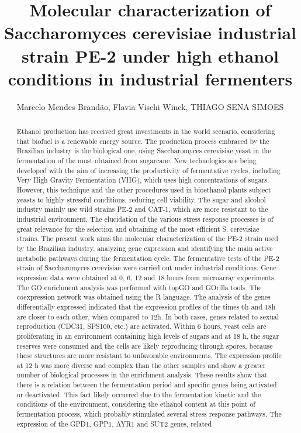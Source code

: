 \documentclass[twoside]{article}
\title{\vspace{-15mm}\fontsize{24pt}{10pt}\selectfont\textbf{ Molecular characterization of Saccharomyces cerevisiae industrial strain PE-2 under high ethanol conditions in industrial fermenters }} %
\author{ Marcelo Mendes Brand\~ao,  Flavia Vischi Winck,  THIAGO SENA SIMOES }
\affil{ CBMEG/UNICAMP }
\date{}
\begin{document}
  
  
  \maketitle %
  
  
  \thispagestyle{fancy} %
  
  
  \begin{abstract}
  Ethanol production has received great investments in the world scenario,  considering that biofuel is a renewable energy source. The production process embraced by the Brazilian industry is the biological one,  using Saccharomyces cerevisiae yeast in the fermentation of the must obtained from sugarcane. New technologies are being developed with the aim of increasing the productivity of fermentative cycles,  including Very High Gravity Fermentation (VHG),  which uses high concentrations of sugars. However,  this technique and the other procedures used in bioethanol plants subject yeasts to highly stressful conditions,  reducing cell viability. The sugar and alcohol industry mainly use wild strains PE-2 and CAT-1,  which are more resistant to the industrial environment. The elucidation of the various stress response processes is of great relevance for the selection and obtaining of the most efficient S. cerevisiae strains. The present work aims the molecular characterization of the PE-2 strain used by the Brazilian industry,  analyzing gene expression and identifying the main active metabolic pathways during the fermentation cycle. The fermentative tests of the PE-2 strain of Saccharomyces cerevisiae were carried out under industrial conditions. Gene expression data were obtained at 0,  6,  12 and 18 hours from microarray experiments. The GO enrichment analysis was performed with topGO and GOrilla tools. The coexpression network was obtained using the R language. The analysis of the genes differentially expressed indicated that the expression profiles of the times 6h and 18h are closer to each other,  when compared to 12h. In both cases,  genes related to sexual reproduction (CDC31,  SPS100,  etc.) are activated. Within 6 hours,  yeast cells are proliferating in an environment containing high levels of sugars and at 18 h,  the sugar reserves were consumed and the cells are likely reproducing through spores,  because these structures are more resistant to unfavorable environments. The expression profile at 12 h was more diverse and complex than the other samples and show a greater number of biological processes in the enrichment analysis. These results show that there is a relation between the fermentation period and specific genes being activated or deactivated. This fact likely occurred due to the fermentation kinetic and the conditions of the environment,  considering the ethanol content at this point of fermentation process,  which probably stimulated several stress response pathways. The expression of the GPD1,  GPP1,  AYR1 and SUT2 genes,  related 
\end{abstract}
\end{document}
